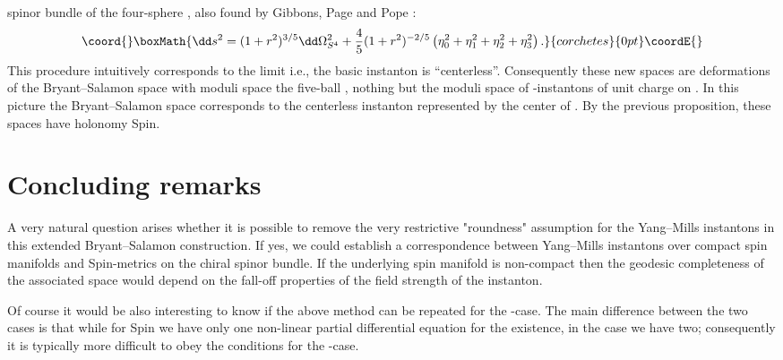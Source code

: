 \documentclass[a4paper,12pt,draft]{article}
\begin{document}
spinor bundle of the four-sphere \cite{bry-sal}, also found by Gibbons,
Page and Pope \cite{gib-pag-pop}:
\[\coord{}\boxMath{\dd s^2=(1+r^2)^{3/5}\dd\Omega^2_{S^4}+{4\over
5}(1+r^2)^{-2/5}\left(\eta_0^2
+\eta_1^2 +\eta_2^2 +\eta_3^2\right) .}{corchetes}{0pt}\coordE{}\] 
This procedure intuitively corresponds to
the limit \myHighlight{$\lambda\rightarrow\infty$}\coordHE{} i.e., the basic instanton 
\coordHE{} is ``centerless''. Consequently these new
spaces are deformations of the Bryant--Salamon space with moduli space the
five-ball \coordHE{}, nothing but the moduli space of \coordHE{}-instantons of
unit charge on \coordHE{}. In this picture the Bryant--Salamon space
corresponds to the centerless instanton represented by the center of
\coordHE{}. By the previous proposition, these spaces have holonomy Spin\coordHE{}.

\section{Concluding remarks}
A very natural question arises whether it is possible to remove the
very restrictive "roundness" assumption for the Yang--Mills instantons in
this extended Bryant--Salamon construction. If yes, we could establish a
correspondence between \coordHE{} Yang--Mills instantons over compact spin
manifolds and Spin\coordHE{}-metrics on the chiral spinor bundle. If the
underlying spin manifold is non-compact then the geodesic completeness of
the associated space would depend on the fall-off properties of the field
strength of the instanton.

Of course it would be also interesting to know if the above method can be
repeated for the \coordHE{}-case. The main difference between the two cases is
that while for Spin\coordHE{} we have only one non-linear partial differential
equation for the existence, in the \coordHE{} case we have two; consequently
it is typically more difficult to obey the conditions for the
\coordHE{}-case. 
\end{document}
